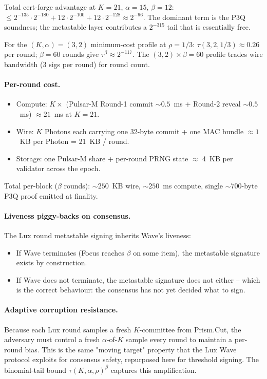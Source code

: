 \noindent Total cert-forge advantage at $K = 21$, $\alpha = 15$,
$\beta = 12$:
$\le 2^{-135} \cdot 2^{-180} + 12 \cdot 2^{-100} + 12 \cdot 2^{-128}
\approx 2^{-96}$. The dominant term is the P3Q soundness; the
metastable layer contributes a $2^{-315}$ tail that is essentially
free.

For the $(K, \alpha) = (3, 2)$ minimum-cost profile at $\rho = 1/3$:
$\tau(3, 2, 1/3) \approx 0.26$ per round; $\beta = 60$ rounds give
$\tau^\beta \approx 2^{-117}$. The $(3, 2) \times \beta = 60$ profile
trades wire bandwidth (3 sigs per round) for round count.

\paragraph{Per-round cost.}
\begin{itemize}[leftmargin=*, itemsep=0pt]
\item Compute: $K \times$ (Pulsar-M Round-1 commit $\sim 0.5$~ms +
Round-2 reveal $\sim 0.5$~ms) $\approx 21$~ms at $K = 21$.
\item Wire: $K$ Photons each carrying one 32-byte commit + one
MAC bundle $\approx 1$~KB per Photon = 21~KB / round.
\item Storage: one Pulsar-M share + per-round PRNG state $\approx$ 4~KB
per validator across the epoch.
\end{itemize}

Total per-block ($\beta$ rounds): $\sim 250$~KB wire, $\sim 250$~ms
compute, single $\sim$700-byte P3Q proof emitted at finality.

\paragraph{Liveness piggy-backs on consensus.}
The Lux round metastable signing inherits Wave's liveness:
\begin{itemize}[leftmargin=*, itemsep=0pt]
\item If Wave terminates (Focus reaches $\beta$ on some item),
the metastable signature exists by construction.
\item If Wave does not terminate, the metastable signature does not
either -- which is the correct behaviour: the consensus has not yet
decided what to sign.
\end{itemize}

\paragraph{Adaptive corruption resistance.}
Because each Lux round samples a fresh $K$-committee from
Prism.Cut, the adversary must control a fresh $\alpha$-of-$K$
sample every round to maintain a per-round bias. This is the same
"moving target" property that the Lux Wave protocol exploits for
consensus safety, repurposed here for threshold signing. The
binomial-tail bound $\tau(K, \alpha, \rho)^\beta$ captures this
amplification.

